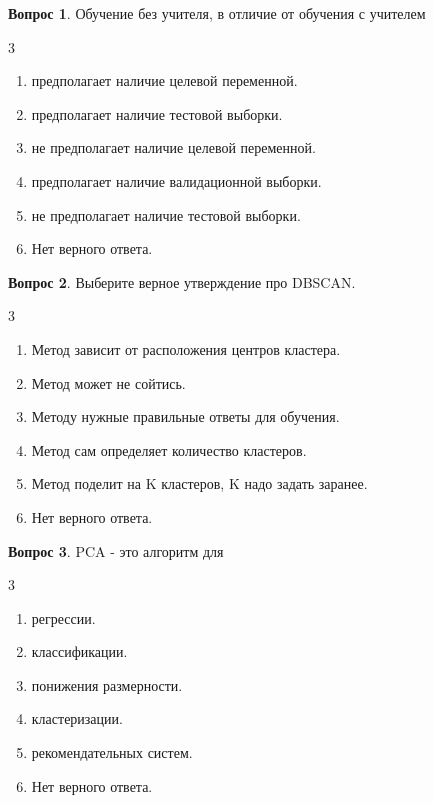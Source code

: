 \documentclass[12pt]{article}
\newenvironment{answerlist}[1][3]{
\begin{multicols}{#1}

\begin{enumerate}[label=\fbox{\emph{\Alph*}},ref=\emph{\alph*}]
}
{
\item Нет верного ответа.
\end{enumerate}
\end{multicols}
}
\theoremstyle{definition}
\newtheorem{question}{Вопрос}
\begin{document}
\begin{question}
Обучение без учителя, в отличие от обучения с учителем
\begin{answerlist}
  \item предполагает наличие целевой переменной.
  \item предполагает наличие тестовой выборки.
  \item не предполагает наличие целевой переменной.
  \item предполагает наличие валидационной выборки.
  \item не предполагает наличие тестовой выборки.
\end{answerlist}
\end{question}

\begin{question}
Выберите верное утверждение про DBSCAN.
\begin{answerlist}
  \item Метод зависит от расположения центров кластера.
  \item Метод может не сойтись.
  \item Методу нужные правильные ответы для обучения.
  \item Метод сам определяет количество кластеров.
  \item Метод поделит на K кластеров, K надо задать заранее.
\end{answerlist}
\end{question}


\begin{question}
PCA - это алгоритм для
\begin{answerlist}
  \item регрессии.
  \item классификации.
  \item понижения размерности.
  \item кластеризации.
  \item рекомендательных систем.
\end{answerlist}
\end{question}
\end{document}

